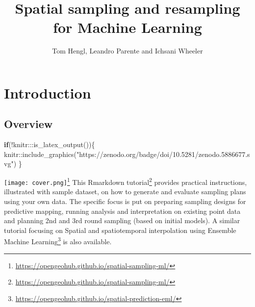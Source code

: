 \documentclass[
  graybox,natbib,nospthms]{svmono}
\title{Spatial sampling and resampling for Machine Learning}
\author{Tom Hengl, Leandro Parente and Ichsani Wheeler}
\date{}
\newenvironment{Shaded}{\begin{snugshade}}{\end{snugshade}}
\newcommand{\ControlFlowTok}[1]{\textcolor[rgb]{0.27,0.27,0.27}{\textbf{#1}}}
\newcommand{\FunctionTok}[1]{\textcolor[rgb]{0,0,0}{#1}}
\newcommand{\NormalTok}[1]{#1}
\newcommand{\SpecialCharTok}[1]{\textcolor[rgb]{0,0,0}{#1}}
\newcommand{\StringTok}[1]{\textcolor[rgb]{0.5,0.5,0.5}{#1}}
\renewcommand{\href}[2]{#2 (\url{#1})}
\renewcommand{\href}[2]{#2\footnote{\url{#1}}}
\begin{document}
\maketitle

\thispagestyle{empty}
\begin{center}
\end{center}

\setlength{\abovedisplayskip}{-5pt}
\setlength{\abovedisplayshortskip}{-5pt}

{
\setcounter{tocdepth}{1}
\tableofcontents
}
\hypertarget{introduction}{%
\chapter*{Introduction}\label{introduction}}

\hypertarget{overview}{%
\section*{Overview}\label{overview}}

\begin{Shaded}
\begin{Highlighting}[]
\ControlFlowTok{if}\NormalTok{(}\SpecialCharTok{!}\NormalTok{knitr}\SpecialCharTok{:::}\FunctionTok{is\_latex\_output}\NormalTok{())\{}
\NormalTok{  knitr}\SpecialCharTok{::}\FunctionTok{include\_graphics}\NormalTok{(}\StringTok{"https://zenodo.org/badge/doi/10.5281/zenodo.5886677.svg"}\NormalTok{)}
\NormalTok{\}}
\end{Highlighting}
\end{Shaded}

\href{https://opengeohub.github.io/spatial-sampling-ml/}{\texttt{[image: cover.png]}} This \href{https://opengeohub.github.io/spatial-sampling-ml/}{Rmarkdown tutorial} provides practical instructions, illustrated with sample
dataset, on how to generate and evaluate sampling plans using your own data.
The specific focus is put on preparing sampling designs for predictive mapping,
running analysis and interpretation on existing point data and planning 2nd and 3rd
round sampling (based on initial models). A similar tutorial focusing on \href{https://opengeohub.github.io/spatial-prediction-eml/}{Spatial
and spatiotemporal interpolation using Ensemble Machine Learning} is also available.
\end{document}
